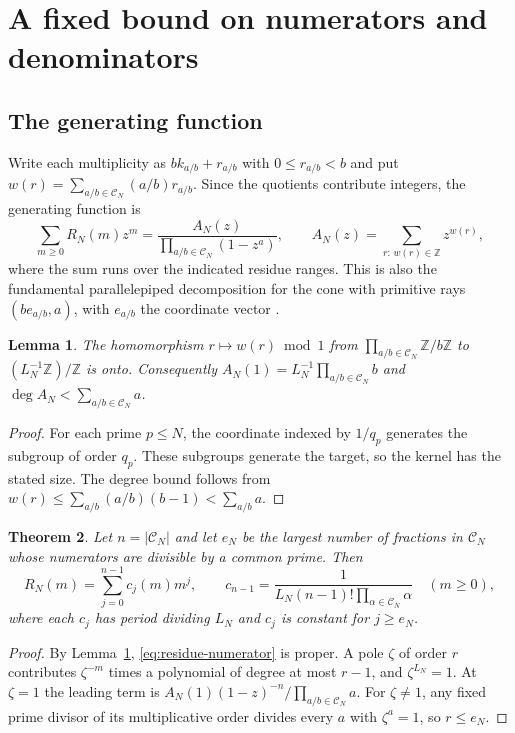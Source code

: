 \documentclass[11pt]{amsart}
\newtheorem{theorem}{Theorem}[section]
\newtheorem{lemma}[theorem]{Lemma}
\theoremstyle{remark}
\newcommand{\Z}{\mathbb Z}
\newcommand{\CN}{\mathcal C_N}
\begin{document}
\section{A fixed bound on numerators and denominators}\label{sec:residue}

\subsection{The generating function}

Write each multiplicity as \(b k_{a/b}+r_{a/b}\) with \(0\le r_{a/b}<b\)
and put \(w(r)=\sum_{a/b\in\CN}(a/b)r_{a/b}\). Since the quotients
contribute integers, the generating function is
\begin{equation}\label{eq:residue-numerator}
 \sum_{m\ge0} R_N(m)z^m
  =\frac{A_N(z)}{\prod_{a/b\in\CN}(1-z^a)},\qquad
 A_N(z)=\sum_{r:\,w(r)\in\Z}z^{w(r)},
\end{equation}
where the sum runs over the indicated residue ranges. This is also
the fundamental parallelepiped decomposition for the cone with
primitive rays \((b e_{a/b},a)\), with \(e_{a/b}\) the coordinate vector
\cite[Theorem~3.5]{beck-robins}.

\begin{lemma}\label{lem:residue-map}
The homomorphism \(r\mapsto w(r)\bmod1\) from
\(\prod_{a/b\in\CN}\Z/b\Z\) to \((L_N^{-1}\Z)/\Z\) is onto.
Consequently \(A_N(1)=L_N^{-1}\prod_{a/b\in\CN}b\) and
\(\deg A_N<\sum_{a/b\in\CN}a\).
\end{lemma}

\begin{proof}
For each prime \(p\le N\), the coordinate indexed by \(1/q_p\) generates the subgroup of order \(q_p\).
These subgroups generate the target, so the kernel has the stated size.
The degree bound follows from \(w(r)\le\sum_{a/b}(a/b)(b-1)<\sum_{a/b}a\).
\end{proof}

\begin{theorem}\label{thm:quasipolynomial}
Let \(n=|\CN|\) and let \(e_N\) be the largest number of fractions in
\(\CN\) whose numerators are divisible by a common prime. Then
\[
 R_N(m)=\sum_{j=0}^{n-1}c_j(m)m^j,\qquad
 c_{n-1}=\frac{1}{L_N(n-1)!\prod_{\alpha\in\CN}\alpha}
 \quad(m\ge0),
\]
where each \(c_j\) has period dividing \(L_N\) and \(c_j\) is constant
for \(j\ge e_N\).
\end{theorem}

\begin{proof}
By Lemma~\ref{lem:residue-map}, \eqref{eq:residue-numerator} is proper.
A pole \(\zeta\) of order \(r\) contributes \(\zeta^{-m}\) times a
polynomial of degree at most \(r-1\), and \(\zeta^{L_N}=1\).
At \(\zeta=1\) the leading term is
\(A_N(1)(1-z)^{-n}/\prod_{a/b\in\CN}a\).
For \(\zeta\ne1\), any fixed prime divisor of its multiplicative order divides
every \(a\) with \(\zeta^a=1\), so \(r\le e_N\).
\end{proof}
\end{document}
